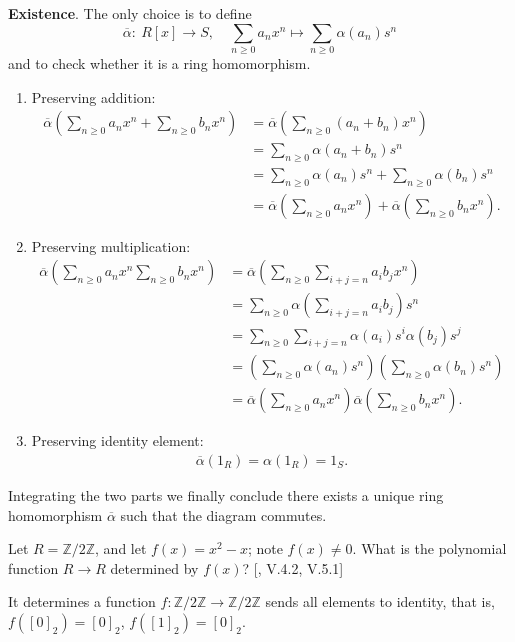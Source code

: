 \documentclass[12pt,letterpaper,boxed]{hmcpset}
\newcommand{\Z}{\mathbb{Z}}
\begin{document}
\begin{solution}
	\noindent\textbf{Existence}. The only choice is to define
	\[
	\overline{\alpha}:\ R[x]\longrightarrow S,\quad \sum_{n \ge 0} a_{n} x^{n}\longmapsto \sum_{n \ge 0} \alpha\left( a_n\right)s^{n}
	\] 
	and to check whether it is a ring homomorphism.
	\begin{enumerate}
		\item Preserving addition:
		\begin{align*}
		\overline{\alpha}\left(\sum_{n \ge 0} a_{n} x^{n}+\sum_{n \ge 0} b_{n} x^{n}\right)&=\overline{\alpha}\left(\sum_{n \ge 0}(a_{n}+b_{n})x^{n}\right)\\
		&=\sum_{n \ge 0}\alpha\left(a_{n}+b_{n}\right)s^{n}\\
		&=\sum_{n \ge 0}\alpha\left(a_{n}\right)s^{n}+\sum_{n \ge 0}\alpha\left(b_{n}\right)s^{n}\\
		&=\overline{\alpha}\left(\sum_{n \ge 0} a_{n} x^{n}\right)+\overline{\alpha}\left(\sum_{n \ge 0} b_{n} x^{n}\right).
		\end{align*}
		\item Preserving multiplication:
		\begin{align*}
		\overline{\alpha}\left(\sum_{n \ge 0} a_{n} x^{n}\sum_{n \ge 0} b_{n} x^{n}\right)&=\overline{\alpha}\left(\sum_{n \ge 0} \sum_{i+j=n} a_{i} b_{j} x^{n}\right)\\
		&=\sum_{n \ge 0}\alpha\left(\sum_{i+j=n} a_{i} b_{j}\right)s^{n}\\
		&=\sum_{n \ge 0}\sum_{i+j=n}\alpha\left(a_{i} \right)s^{i}\alpha\left( b_{j}\right)s^{j}\\
		&=\left(\sum_{n \ge 0}\alpha\left(a_{n}\right)s^{n}\right)\left(\sum_{n \ge 0}\alpha\left(b_{n}\right)s^{n}\right)\\
		&=\overline{\alpha}\left(\sum_{n \ge 0} a_{n} x^{n}\right)\overline{\alpha}\left(\sum_{n \ge 0} b_{n} x^{n}\right).
		\end{align*}
		\item Preserving identity element:
		\begin{align*}
		\overline{\alpha}(1_R)=\alpha(1_R)=1_S.
		\end{align*}
	\end{enumerate}
	Integrating the two parts we finally conclude there exists a unique ring homomorphism $\overline{\alpha}$ such that the diagram commutes.
	
\end{solution}

\begin{problem}[2.7]
	Let $R=\Z/2\Z$, and let $f(x)=x^2-x$; note $f(x)\ne 0$. What is the polynomial function $R\to R$ determined by $f(x)$? [, \textsection V.4.2, \textsection V.5.1]
\end{problem}
\begin{solution}
	It determines a function $f:\Z/2\Z\to\Z/2\Z$ sends all elements to identity, that is, $f([0]_2)=[0]_2$, $f([1]_2)=[0]_2$.
\end{solution}
\end{document}
